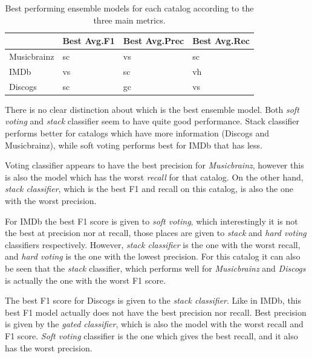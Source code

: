 \documentclass[epsfig,a4paper,11pt,titlepage,twoside,openany]{book}
\begin{document}
\begin{table}[H]
\centering
\begin{tabular}{l|l|l|l}
                                 & Best Avg.F1 & Best Avg.Prec & Best Avg.Rec \\ \hline
\multicolumn{1}{l|}{Musicbrainz} & sc          & vs            & sc           \\ \hline
\multicolumn{1}{l|}{IMDb}        & vs          & sc            & vh           \\ \hline
\multicolumn{1}{l|}{Discogs}     & sc          & gc            & vs           \\ 
\end{tabular}
\caption{Best performing ensemble models for each catalog according to the three main metrics.}
\label{tab:best-ensemble-model-per-metric-average}
\end{table}


There is no clear distinction about which is the best ensemble model. Both \textit{soft voting} and \textit{stack} classifier seem to have quite good performance. Stack classifier performs better for catalogs which have more information (Discogs and Musicbrainz), while soft voting performs best for IMDb that has less. 

Voting classifier appears to have the best precision for \textit{Musicbrainz}, however this is also the model which has the worst \textit{recall} for that catalog. On the other hand, \textit{stack classifier}, which is the best F1 and recall on this catalog, is also the one with the worst precision. 

For IMDb the best F1 score is given to \textit{soft voting}, which interestingly it is not the best at precision nor at recall, those places are given to \textit{stack} and \textit{hard voting} classifiers respectively. However, \textit{stack classifier} is the one with the worst recall, and \textit{hard voting} is the one with the lowest precision. For this catalog it can also be seen that the \textit{stack} classifier, which performs well for \textit{Musicbrainz} and \textit{Discogs} is actually the one with the worst F1 score.

The best F1 score for Discogs is given to the \textit{stack classifier}. Like in IMDb, this best F1 model actually does not have the best precision nor recall. Best precision is given by the \textit{gated classifier}, which is also the model with the worst recall and F1 score. \textit{Soft voting} classifier is the one which gives the best recall, and it also has the worst precision.
\end{document}
